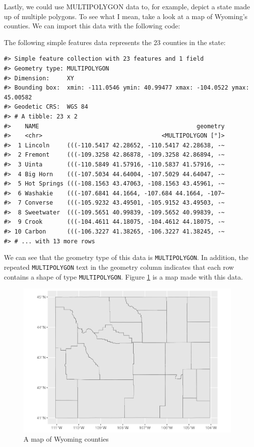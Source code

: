 \documentclass[
]{book}
\begin{document}
Lastly, we could use MULTIPOLYGON data to, for example, depict a state made up of multiple polygons. To see what I mean, take a look at a map of Wyoming's counties. We can import this data with the following code:

The following simple features data represents the 23 counties in the state:

\begin{verbatim}
#> Simple feature collection with 23 features and 1 field
#> Geometry type: MULTIPOLYGON
#> Dimension:     XY
#> Bounding box:  xmin: -111.0546 ymin: 40.99477 xmax: -104.0522 ymax: 45.00582
#> Geodetic CRS:  WGS 84
#> # A tibble: 23 x 2
#>    NAME                                             geometry
#>    <chr>                                  <MULTIPOLYGON [°]>
#>  1 Lincoln     (((-110.5417 42.28652, -110.5417 42.28638, -~
#>  2 Fremont     (((-109.3258 42.86878, -109.3258 42.86894, -~
#>  3 Uinta       (((-110.5849 41.57916, -110.5837 41.57916, -~
#>  4 Big Horn    (((-107.5034 44.64004, -107.5029 44.64047, -~
#>  5 Hot Springs (((-108.1563 43.47063, -108.1563 43.45961, -~
#>  6 Washakie    (((-107.6841 44.1664, -107.684 44.1664, -107~
#>  7 Converse    (((-105.9232 43.49501, -105.9152 43.49503, -~
#>  8 Sweetwater  (((-109.5651 40.99839, -109.5652 40.99839, -~
#>  9 Crook       (((-104.4611 44.18075, -104.4612 44.18075, -~
#> 10 Carbon      (((-106.3227 41.38265, -106.3227 41.38245, -~
#> # ... with 13 more rows
\end{verbatim}

We can see that the geometry type of this data is \texttt{MULTIPOLYGON}. In addition, the repeated \texttt{MULTIPOLYGON} text in the geometry column indicates that each row contains a shape of type \texttt{MULTIPOLYGON}. Figure \ref{fig:wyoming-counties-map} is a map made with this data.

\begin{figure}
\includegraphics[width=1\linewidth]{maps_files/figure-latex/wyoming-counties-map-1} \caption{A map of Wyoming counties}\label{fig:wyoming-counties-map}
\end{figure}
\end{document}
